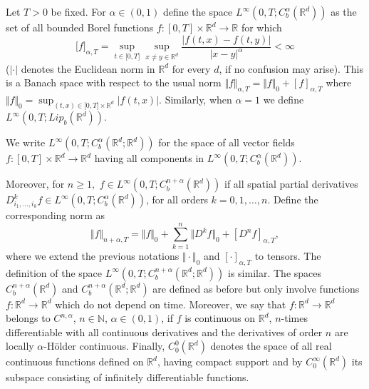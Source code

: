 \documentclass{article}
\begin{document}
Let $T>0$ be fixed. For ${\alpha}\in(0,1)$ define the space
$L^{\infty}\left(
0,T;C_{b}^{\alpha}({\mathbb{R}}^{d})\right)  $ as the set of all bounded Borel
functions $f:[0,T]\times{\mathbb{R}}^{d}\rightarrow{\mathbb{R}}$ for which
\[
\lbrack f]_{\alpha,T}=\sup_{t\in\lbrack0,T]}\sup_{x\neq y\in{\mathbb{R}}^{d}%
}\frac{|f(t,x)-f(t,y)|}{|x-y|^{\alpha}}<\infty
\]
($|\cdot|$ denotes the Euclidean norm in ${\mathbb{R}}^{d}$ for every $d$, if
no confusion may arise). This is a Banach space with respect to the usual norm
$\Vert f\Vert_{{\alpha},T}=\Vert f\Vert_{0}+[f]_{\alpha,T}$ where $\Vert
f\Vert_{0}=\sup_{(t,x)\in\lbrack0,T]\times{\mathbb{R}}^{d}}|f(t,x)| $.
 Similarly, when $\alpha =1$ we define $L^{\infty}\left(
0,T; Lip_b({\mathbb{R}}^{d})\right)$.


We write $L^{\infty}\left(  0,T;C_{b}^{\alpha}({\mathbb{R}}^{d};{\mathbb{R}%
}^{d})\right)  $ for the space of all vector fields $f:[0,T]\times{\mathbb{R}%
}^{d}\rightarrow{\mathbb{R}}^{d}$ having all components in $L^{\infty}\left(
0,T;C_{b}^{\alpha}({\mathbb{R}}^{d})\right)  $.



Moreover, for $n\geq1,$ $f\in L^{\infty}\left(  0,T;C_{b}^{n+\alpha
}({\mathbb{R}}^{d})\right)  $ if all spatial partial derivatives
$D_{i_{1},...,i_{k}}^{k}f\in L^{\infty}\left(  0,T;C_{b}^{\alpha}({\mathbb{R}%
}^{d})\right)  $, for all orders $k=0,1,\dots,n$. Define the corresponding
norm as
\[
\Vert f\Vert_{n+\alpha,T}=\Vert f\Vert_{0}+\sum_{k=1}^{n}\Vert
D^{k}f\Vert _{0}+[D^{n}f]_{\alpha,T},
\]
where we extend the previous notations $\Vert\cdot\Vert_{0}$ and
$[\cdot]_{\alpha,T}$ to tensors. The definition of the space $L^{\infty
}\left(  0,T;C_{b}^{n+\alpha}({\mathbb{R}}^{d};{\mathbb{R}}^{d})\right)  $ is
similar.
 The spaces $C_{b}^{n+{\alpha}}({\mathbb{R}}^{d})$ and
$C_{b}^{n+{\alpha}}({\mathbb{R}}^{d};{\mathbb{R}}^{d})$ are defined as before
but only involve functions $f:{\mathbb{R}}^{d}\rightarrow{\mathbb{R}}^{d}$
which do not depend on time. Moreover, we say that $f:\mathbb{R}%
^{d}\rightarrow\mathbb{R}^{d}$ belongs to $C^{n,\alpha}$, $n\in\mathbb{N} $,
$\alpha\in(0,1)$, if $f$ is continuous on $\mathbb{R}^{d}$, $n$-times
differentiable with all continuous derivatives and the derivatives of order
$n$ are locally $\alpha$-H\"{o}lder continuous. Finally, $C_{0}^{0}%
(\mathbb{R}^{d})$ denotes the space of all real continuous functions defined
on $\mathbb{R}^{d}$, having compact support and by $C_{0}^{\infty}%
(\mathbb{R}^{d})$ its subspace consisting of infinitely differentiable functions.
\end{document}
